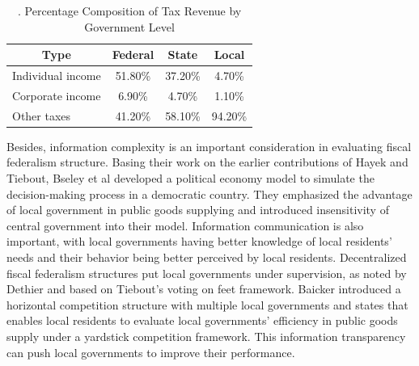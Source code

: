 \begin{table}[htbp]
  \centering
  \caption{. Percentage Composition of Tax Revenue by Government Level}
  \begin{tabular}{lccc}
    \toprule
    \multicolumn{1}{c}{Type} & Federal & State   & Local   \\
    \midrule
    Individual income        & 51.80\% & 37.20\% & 4.70\%  \\
    Corporate income         & 6.90\%  & 4.70\%  & 1.10\%  \\
    Other taxes              & 41.20\% & 58.10\% & 94.20\% \\
    \bottomrule
  \end{tabular}%
  \label{Table 1.2}%
\end{table}%


Besides, information complexity is an important consideration in evaluating fiscal federalism structure. Basing their work on the earlier contributions of Hayek and Tiebout, Bseley et al \cite{2003Centralized} developed a political economy model to simulate the decision-making process in a democratic country. They emphasized the advantage of local government in public goods supplying and introduced insensitivity of central government into their model. Information communication is also important, with local governments having better knowledge of local residents' needs and their behavior being better perceived by local residents. Decentralized fiscal federalism structures put local governments under supervision, as noted by Dethier \cite{martinez2003fiscal} and based on Tiebout's voting on feet framework. Baicker \cite{baicker2005spillover} introduced a horizontal competition structure with multiple local governments and states that enables local residents to evaluate local governments' efficiency in public goods supply under a yardstick competition framework. This information transparency can push local governments to improve their performance.

